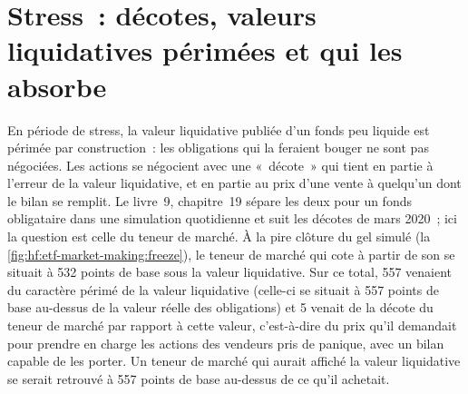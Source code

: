 \begin{omfigure}

\label{fig:hf:etf-market-making:freeze}
\end{omfigure}

\section{Stress~: décotes, valeurs liquidatives périmées et qui les absorbe}

En période de stress, la valeur liquidative publiée d'un fonds peu liquide est périmée par construction~: les obligations qui la feraient bouger ne sont pas négociées. Les actions
se négocient avec une «~décote~» qui tient en partie à l'erreur de la valeur liquidative, et en partie au prix d'une vente à quelqu'un dont le bilan
se remplit. Le livre~9, chapitre~19 sépare les deux pour un fonds obligataire dans une simulation quotidienne et suit les décotes de mars 2020~; ici la question est
celle du teneur de marché. À la pire clôture du gel simulé (la \cref{fig:hf:etf-market-making:freeze}), le teneur de marché qui cote à partir de son  se situait à 532 points de base sous la valeur liquidative. Sur ce total, 557 venaient du caractère périmé de la valeur liquidative (celle-ci se situait à 557 points de base
au-dessus de la valeur réelle des obligations) et 5 venait de la décote du teneur de marché par rapport à cette valeur, c'est-à-dire du prix qu'il demandait pour prendre en charge les actions des vendeurs pris de panique, avec
un bilan capable de les porter. Un teneur de marché qui aurait affiché la valeur liquidative se serait retrouvé à 557 points de base au-dessus de ce qu'il achetait.

